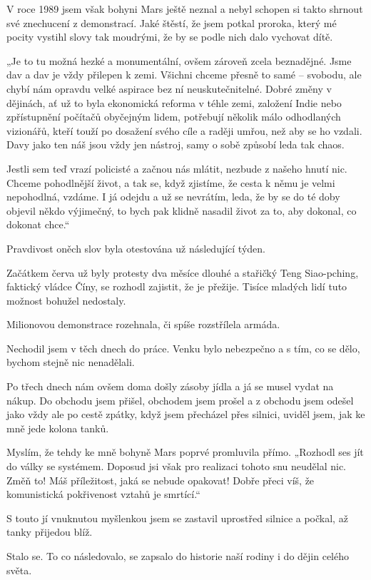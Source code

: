 V roce 1989 jsem však bohyni Mars ještě neznal a nebyl schopen si takto shrnout své znechucení z demonstrací. Jaké štěstí, že jsem potkal proroka, který mé pocity vystihl slovy tak moudrými, že by se podle nich dalo vychovat dítě.

„Je to tu možná hezké a monumentální, ovšem zároveň zcela beznadějné. Jsme dav a dav je vždy přilepen k zemi. Všichni chceme přesně to samé – svobodu, ale chybí nám opravdu velké aspirace bez ní neuskutečnitelné. Dobré změny v dějinách, ať už to byla ekonomická reforma v téhle zemi, založení Indie nebo zpřístupnění počítačů obyčejným lidem, potřebují několik málo odhodlaných vizionářů, kteří touží po dosažení svého cíle a raději umřou, než aby se ho vzdali. Davy jako ten náš jsou vždy jen nástroj, samy o sobě způsobí leda tak chaos.

Jestli sem teď vrazí policisté a začnou nás mlátit, nezbude z našeho hnutí nic. Chceme pohodlnější život, a tak se, když zjistíme, že cesta k němu je velmi nepohodlná, vzdáme.  I já odejdu a už se nevrátím, leda, že by se do té doby objevil někdo výjimečný, to bych pak klidně nasadil život za to, aby dokonal, co dokonat chce.“

Pravdivost oněch slov byla otestována už následující týden.
	
Začátkem červa už byly protesty dva měsíce dlouhé a stařičký Teng Siao-pching, faktický vládce Číny, se rozhodl zajistit, že je přežije. Tisíce mladých lidí tuto možnost bohužel nedostaly.

Milionovou demonstrace rozehnala, či spíše rozstřílela armáda. 

Nechodil jsem v těch dnech do práce. Venku bylo nebezpečno a s tím, co se dělo, bychom stejně nic nenadělali.

Po třech dnech nám ovšem doma došly zásoby jídla a já se musel vydat na nákup. Do obchodu jsem přišel, obchodem jsem prošel a z obchodu jsem odešel jako vždy ale po cestě zpátky, když jsem přecházel přes silnici, uviděl jsem, jak ke mně jede kolona tanků.

Myslím, že tehdy ke mně bohyně Mars poprvé promluvila přímo. „Rozhodl ses jít do války se systémem. Doposud jsi však pro realizaci tohoto snu neudělal nic. Změň to! Máš příležitost, jaká se nebude opakovat! Dobře přeci víš, že komunistická pokřivenost vztahů je smrtící.“

S touto jí vnuknutou myšlenkou jsem se zastavil uprostřed silnice a počkal, až tanky přijedou blíž. 

Stalo se. To co následovalo, se zapsalo do historie naší rodiny i do dějin celého světa.  
	
